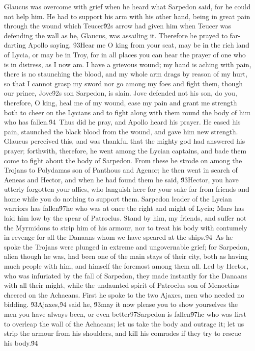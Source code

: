 {Glaucus was overcome with grief when he heard what Sarpedon said, for he could not help him. He had to support his arm with his other hand, being in great pain through the wound which Teucer\'92s arrow had given him when Teucer was defending the wall as he, Glaucus, was assailing it. Therefore he prayed to far-darting Apollo saying, \'93Hear me O king from your seat, may be in the rich land of Lycia, or may be in Troy, for in all places you can hear the prayer of one who is in distress, as I now am. I have a grievous wound; my hand is aching with pain, there is no staunching the blood, and my whole arm drags by reason of my hurt, so that I cannot grasp my sword nor go among my foes and fight them, though our prince, Jove\'92s son Sarpedon, is slain. Jove defended not his son, do you, therefore, O king, heal me of my wound, ease my pain and grant me strength both to cheer on the Lycians and to fight along with them round the body of him who has fallen.\'94\
Thus did he pray, and Apollo heard his prayer. He eased his pain, staunched the black blood from the wound, and gave him new strength. Glaucus perceived this, and was thankful that the mighty god had answered his prayer; forthwith, therefore, he went among the Lycian captains, and bade them come to fight about the body of Sarpedon. From these he strode on among the Trojans to Polydamas son of Panthous and Agenor; he then went in search of Aeneas and Hector, and when he had found them he said, \'93Hector, you have utterly forgotten your allies, who languish here for your sake far from friends and home while you do nothing to support them. Sarpedon leader of the Lycian warriors has fallen\'97he who was at once the right and might of Lycia; Mars has laid him low by the spear of Patroclus. Stand by him, my friends, and suffer not the Myrmidons to strip him of his armour, nor to treat his body with contumely in revenge for all the Danaans whom we have speared at the ships.\'94\
As he spoke the Trojans were plunged in extreme and ungovernable grief; for Sarpedon, alien though he was, had been one of the main stays of their city, both as having much people with him, and himself the foremost among them all. Led by Hector, who was infuriated by the fall of Sarpedon, they made instantly for the Danaans with all their might, while the undaunted spirit of Patroclus son of Menoetius cheered on the Achaeans. First he spoke to the two Ajaxes, men who needed no bidding. \'93Ajaxes,\'94 said he, \'93may it now please you to show yourselves the men you have always been, or even better\'97Sarpedon is fallen\'97he who was first to overleap the wall of the Achaeans; let us take the body and outrage it; let us strip the armour from his shoulders, and kill his comrades if they try to rescue his body.\'94\
}
